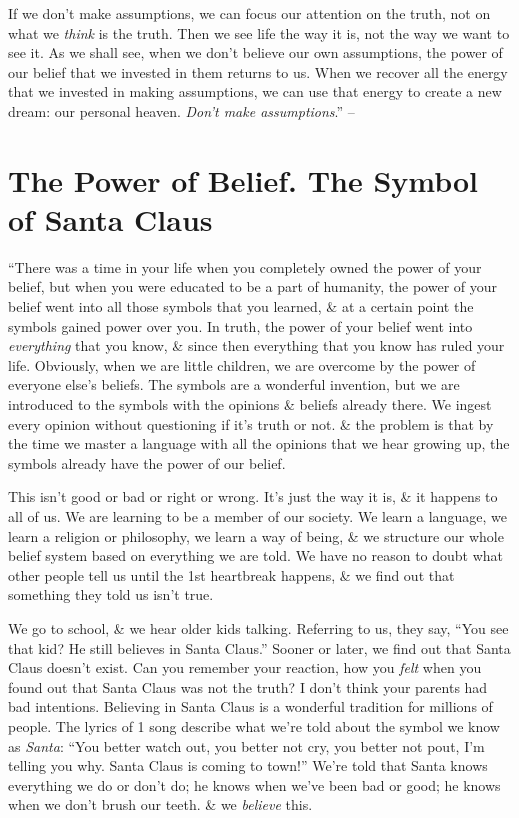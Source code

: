 \documentclass{article}
\numberwithin{equation}{section}
\begin{document}
If we don't make assumptions, we can focus our attention on the truth, not on what we \textit{think} is the truth. Then we see life the way it is, not the way we want to see it. As we shall see, when we don't believe our own assumptions, the power of our belief that we invested in them returns to us. When we recover all the energy that we invested in making assumptions, we can use that energy to create a new dream: our personal heaven. \textit{Don't make assumptions}.'' -- \cite[pp. 55--57]{Ruiz_Ruiz2011}


\section{The Power of Belief. The Symbol of Santa Claus}
``There was a time in your life when you completely owned the power of your belief, but when you were educated to be a part of humanity, the power of your belief went into all those symbols that you learned, \& at a certain point the symbols gained power over you. In truth, the power of your belief went into \textit{everything} that you know, \& since then everything that you know has ruled your life. Obviously, when we are little children, we are overcome by the power of everyone else's beliefs. The symbols are a wonderful invention, but we are introduced to the symbols with the opinions \& beliefs already there. We ingest every opinion without questioning if it's truth or not. \& the problem is that by the time we master a language with all the opinions that we hear growing up, the symbols already have the power of our belief.

This isn't good or bad or right or wrong. It's just the way it is, \& it happens to all of us. We are learning to be a member of our society. We learn a language, we learn a religion or philosophy, we learn a way of being, \& we structure our whole belief system based on everything we are told. We have no reason to doubt what other people tell us until the 1st heartbreak happens, \& we find out that something they told us isn't true.

We go to school, \& we hear older kids talking. Referring to us, they say, ``You see that kid? He still believes in Santa Claus.'' Sooner or later, we find out that Santa Claus doesn't exist. Can you remember your reaction, how you \textit{felt} when you found out that Santa Claus was not the truth? I don't think your parents had bad intentions. Believing in Santa Claus is a wonderful tradition for millions of people. The lyrics of 1 song describe what we're told about the symbol we know as \textit{Santa}: ``You better watch out, you better not cry, you better not pout, I'm telling you why. Santa Claus is coming to town!'' We're told that Santa knows everything we do or don't do; he knows when we've been bad or good; he knows when we don't brush our teeth. \& we \textit{believe} this.
\end{document}
